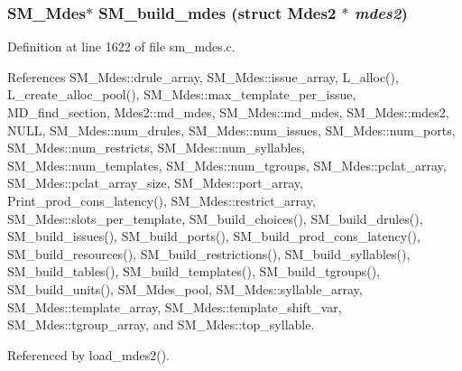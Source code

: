 \subsubsection{\setlength{\rightskip}{0pt plus 5cm}\bf{SM\_\-Mdes}$\ast$ SM\_\-build\_\-mdes (struct \bf{Mdes2} $\ast$ {\em mdes2})}\label{sm__mdes_8h_8d77c1d29c06062dc8d92084baff9a3d}




Definition at line 1622 of file sm\_\-mdes.c.

References SM\_\-Mdes::drule\_\-array, SM\_\-Mdes::issue\_\-array, L\_\-alloc(), L\_\-create\_\-alloc\_\-pool(), SM\_\-Mdes::max\_\-template\_\-per\_\-issue, MD\_\-find\_\-section, Mdes2::md\_\-mdes, SM\_\-Mdes::md\_\-mdes, SM\_\-Mdes::mdes2, NULL, SM\_\-Mdes::num\_\-drules, SM\_\-Mdes::num\_\-issues, SM\_\-Mdes::num\_\-ports, SM\_\-Mdes::num\_\-restricts, SM\_\-Mdes::num\_\-syllables, SM\_\-Mdes::num\_\-templates, SM\_\-Mdes::num\_\-tgroups, SM\_\-Mdes::pclat\_\-array, SM\_\-Mdes::pclat\_\-array\_\-size, SM\_\-Mdes::port\_\-array, Print\_\-prod\_\-cons\_\-latency(), SM\_\-Mdes::restrict\_\-array, SM\_\-Mdes::slots\_\-per\_\-template, SM\_\-build\_\-choices(), SM\_\-build\_\-drules(), SM\_\-build\_\-issues(), SM\_\-build\_\-ports(), SM\_\-build\_\-prod\_\-cons\_\-latency(), SM\_\-build\_\-resources(), SM\_\-build\_\-restrictions(), SM\_\-build\_\-syllables(), SM\_\-build\_\-tables(), SM\_\-build\_\-templates(), SM\_\-build\_\-tgroups(), SM\_\-build\_\-units(), SM\_\-Mdes\_\-pool, SM\_\-Mdes::syllable\_\-array, SM\_\-Mdes::template\_\-array, SM\_\-Mdes::template\_\-shift\_\-var, SM\_\-Mdes::tgroup\_\-array, and SM\_\-Mdes::top\_\-syllable.

Referenced by load\_\-mdes2().